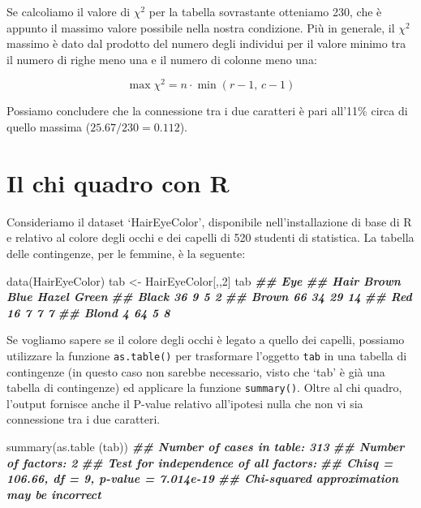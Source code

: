 \documentclass[
  12pt,
]{book}
\newenvironment{Shaded}{\begin{snugshade}}{\end{snugshade}}
\newcommand{\DecValTok}[1]{\textcolor[rgb]{0.00,0.00,0.81}{#1}}
\newcommand{\DocumentationTok}[1]{\textcolor[rgb]{0.56,0.35,0.01}{\textbf{\textit{#1}}}}
\newcommand{\FunctionTok}[1]{\textcolor[rgb]{0.00,0.00,0.00}{#1}}
\newcommand{\NormalTok}[1]{#1}
\newcommand{\OtherTok}[1]{\textcolor[rgb]{0.56,0.35,0.01}{#1}}
\begin{document}
Se calcoliamo il valore di \(\chi^2\) per la tabella sovrastante otteniamo 230, che è appunto il massimo valore possibile nella nostra condizione. Più in generale, il \(\chi^2\) massimo è dato dal prodotto del numero degli individui per il valore minimo tra il numero di righe meno una e il numero di colonne meno una:

\[\max \chi ^2  = n \cdot \min (r - 1,\,c - 1)\]

Possiamo concludere che la connessione tra i due caratteri è pari all'11\% circa di quello massima (\(25.67/230 = 0.112\)).

\hypertarget{il-chi-quadro-con-r}{%
\section{Il chi quadro con R}\label{il-chi-quadro-con-r}}

Consideriamo il dataset `HairEyeColor', disponibile nell'installazione di base di R e relativo al colore degli occhi e dei capelli di 520 studenti di statistica. La tabella delle contingenze, per le femmine, è la seguente:

\begin{Shaded}
\begin{Highlighting}[]
\FunctionTok{data}\NormalTok{(HairEyeColor)}
\NormalTok{tab }\OtherTok{\textless{}{-}}\NormalTok{ HairEyeColor[,,}\DecValTok{2}\NormalTok{]}
\NormalTok{tab}
\DocumentationTok{\#\#        Eye}
\DocumentationTok{\#\# Hair    Brown Blue Hazel Green}
\DocumentationTok{\#\#   Black    36    9     5     2}
\DocumentationTok{\#\#   Brown    66   34    29    14}
\DocumentationTok{\#\#   Red      16    7     7     7}
\DocumentationTok{\#\#   Blond     4   64     5     8}
\end{Highlighting}
\end{Shaded}

Se vogliamo sapere se il colore degli occhi è legato a quello dei capelli, possiamo utilizzare la funzione \texttt{as.table()} per trasformare l'oggetto \texttt{tab} in una tabella di contingenze (in questo caso non sarebbe necessario, visto che `tab' è già una tabella di contingenze) ed applicare la funzione \texttt{summary()}. Oltre al chi quadro, l'output fornisce anche il P-value relativo all'ipotesi nulla che non vi sia connessione tra i due caratteri.

\begin{Shaded}
\begin{Highlighting}[]
\FunctionTok{summary}\NormalTok{(}\FunctionTok{as.table}\NormalTok{ (tab))}
\DocumentationTok{\#\# Number of cases in table: 313 }
\DocumentationTok{\#\# Number of factors: 2 }
\DocumentationTok{\#\# Test for independence of all factors:}
\DocumentationTok{\#\#  Chisq = 106.66, df = 9, p{-}value = 7.014e{-}19}
\DocumentationTok{\#\#  Chi{-}squared approximation may be incorrect}
\end{Highlighting}
\end{Shaded}
\end{document}
